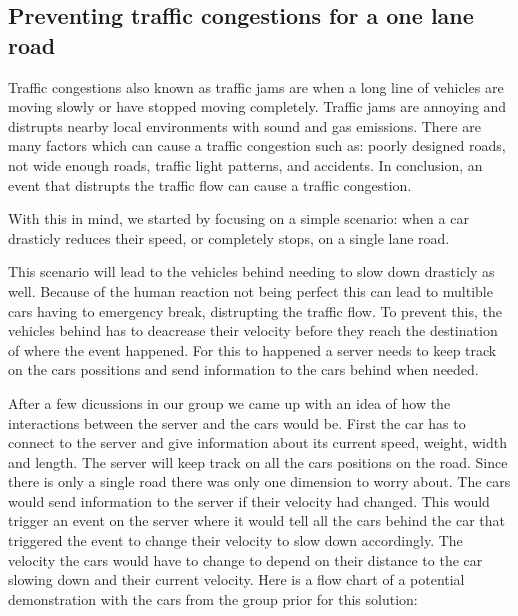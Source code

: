 \subsection{Preventing traffic congestions for a one lane road}

Traffic congestions also known as traffic jams are when a long line of vehicles are moving slowly or have stopped moving completely. Traffic jams are annoying and distrupts nearby local environments with sound and gas emissions. There are many factors which can cause a traffic congestion such as:
poorly designed roads, not wide enough roads, traffic light patterns, and accidents. In conclusion, an event that distrupts the traffic flow can cause a traffic congestion.

With this in mind, we started by focusing on a simple scenario: when a car drasticly reduces their speed, or completely stops, on a single lane road. 

This scenario will lead to the vehicles behind needing to slow down drasticly as well. Because of the human reaction not being perfect this can lead to multible cars having to emergency break, distrupting the traffic flow. To prevent this, the vehicles behind has to deacrease their velocity before they reach the destination of where the event happened. For this to happened a server needs to keep track on the cars possitions and send information to the cars behind when needed. 

After a few dicussions in our group we came up with an idea of how the interactions between the server and the cars would be. First the car has to connect to the server and give information about its current speed, weight, width and length. The server will keep track on all the cars positions on the road. Since there is only a single road there was only one dimension to worry about. The cars would send information to the server if their velocity had changed. This would trigger an event on the server where it would tell all the cars behind the car that triggered the event to change their velocity to slow down accordingly. The velocity the cars would have to change to depend on their distance to the car slowing down and their current velocity. Here is a flow chart of a potential demonstration with the cars from the group prior for this solution:

